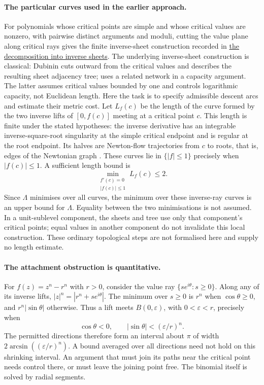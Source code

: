 \documentclass[11pt]{article}
\begin{document}
\paragraph{The particular curves used in the earlier approach.}
For polynomials whose critical points are simple and whose critical values
are nonzero, with pairwise distinct arguments and moduli, cutting the
value plane along critical rays gives the finite inverse-sheet construction
recorded in
\href{https://github.com/wcook04/plectis-erdos/blob/f36a98bf3d3e6f65f1074e3b800e3293d5b8a51a/ErdosProblems/Erdos1041/AttachmentAwareReeb.md}{the decomposition into inverse sheets}.
The underlying inverse-sheet construction is classical: Dubinin
\cite[\S1, pp.~1169--1170]{dubinin2006critical} cuts outward from the
critical values and describes the resulting sheet adjacency tree;
\cite[\S2, pp.~34--35]{dubinin2006capacity} uses a related network in a
capacity argument.  The latter assumes critical values bounded by one and
controls logarithmic capacity, not Euclidean length.  Here the task is to
specify admissible descent arcs and estimate their metric cost.
Let $L_f(c)$ be the length of the curve formed by the two inverse lifts
of $[0,f(c)]$ meeting at a critical point $c$. This length is finite under
the stated hypotheses: the inverse derivative has an integrable
inverse-square-root singularity at the simple critical endpoint and is
regular at the root endpoint. Its halves are Newton-flow
trajectories from $c$ to roots, that is, edges of the Newtonian graph
\cite[Definition~2.1]{kozen-stefansson1997}. These curves lie in
$\{|f|\le1\}$ precisely when $|f(c)|\le1$. A sufficient length bound is
\[
 \min_{\substack{f'(c)=0\\|f(c)|\le1}}L_f(c)\le2.
\]
Since $\Lambda$ minimises over all curves, the minimum over these
inverse-ray curves is an upper bound for $\Lambda$. Equality between the
two minimisations is not assumed.
In a unit-sublevel component, the sheets and tree use only that
component's critical points; equal values in another component do not
invalidate this local construction. These ordinary topological steps
are not formalised here and supply no length estimate.

\paragraph{The attachment obstruction is quantitative.}
For $f(z)=z^n-r^n$ with $r>0$, consider the value ray
$\{s e^{i\theta}:s\ge0\}$. Along any of its inverse lifts,
$|z|^n=|r^n+s e^{i\theta}|$. The minimum over $s\ge0$ is $r^n$
when $\cos\theta\ge0$, and $r^n|\sin\theta|$ otherwise. Thus a lift
meets $B(0,\varepsilon)$, with $0<\varepsilon<r$, precisely when
\[
 \cos\theta<0,\qquad
 |\sin\theta|<(\varepsilon/r)^n.
\]
The permitted directions therefore form an interval about $\pi$ of
width $2\arcsin((\varepsilon/r)^n)$. A bound averaged over all directions
need not hold on this shrinking interval. An argument that must join its
paths near the critical point needs control there, or must leave the
joining point free. The binomial itself is solved by radial segments.
\end{document}

